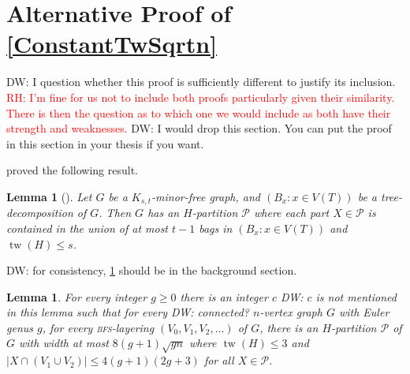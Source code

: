 \documentclass[12pt]{article}
\renewcommand{\geq}{\geqslant}
\renewcommand{\leq}{\leqslant}
\DeclareMathOperator{\tw}{tw}
\newcommand{\PP}{\mathcal{P}}
\newcommand{\david}[1]{{\color{blue} DW: #1}}
\newcommand{\vida}[1]{{\color{DarkGreen} V: #1}}
\newcommand{\robert}[1]{\textcolor{red}{RH: #1}}
\theoremstyle{plain}
\newtheorem{lem}[thm]{Lemma}
\theoremstyle{definition}
\begin{document}



\section{Alternative Proof of \cref{ConstantTwSqrtn}}

\david{I question whether this proof is sufficiently different to justify its inclusion. }\robert{I'm fine for us not to include both proofs particularly given their similarity. There is then the question as to which one we would include as both have their strength and weaknesses.} \david{I would drop this section. You can put the proof in this section in your thesis if you want.}

\citet[Theorem~12]{ISW} proved the following result. 

\begin{lem}[\cite{ISW}]\label{TdecompPartition}
    Let $G$ be a $K_{s,t}$-minor-free graph, and $(B_x \colon x\in V(T))$ be a tree-decomposition of $G$. Then $G$ has an $H$-partition $\PP$ where each part $X\in \PP$ is contained in the union of at most $t-1$ bags in $(B_x \colon x\in V(T))$ and $\tw(H)\leq s$. 
\end{lem}

\david{for consistency, \cref{TdecompPartition} should be in the background section.}


\begin{lem}\label{bfsPartitionGenus}
    For every integer $g\geq 0$ there is an integer $c$ \david{$c$ is not mentioned in this lemma} such that for every \david{connected?} $n$-vertex graph $G$ with Euler genus $g$, for every \textsc{bfs}-layering $(V_0,V_1,V_2,\dots)$ of $G$, there is an $H$-partition $\PP$ of $G$ with width at most $8(g+1){\sqrt{gn}}$ where $\tw(H)\leq 3$ and $|X\cap (V_1\cup V_2)|\leq 4(g+1)(2g+3)$ for all $X \in \PP$.
\end{lem}
\end{document}
